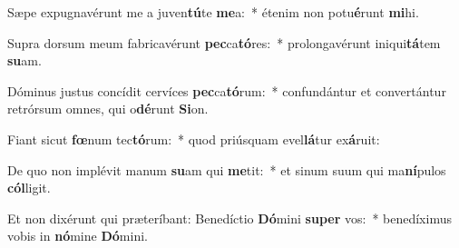 \item Sæpe expugnavérunt me a juven\textbf{tú}te \textbf{me}a:~* étenim non potu\textbf{é}runt \textbf{mi}hi.
\item Supra dorsum meum fabricavérunt \textbf{pec}ca\textbf{tó}res:~* prolongavérunt iniqui\textbf{tá}tem \textbf{su}am.
\item Dóminus justus concídit cervíces \textbf{pec}ca\textbf{tó}rum:~* confundántur et convertántur retrórsum omnes, qui o\textbf{dé}runt \textbf{Si}on.
\item Fiant sicut \textbf{fœ}num tec\textbf{tó}rum:~* quod priúsquam evel\textbf{lá}tur ex\textbf{á}ruit:
\item De quo non implévit manum \textbf{su}am qui \textbf{me}tit:~* et sinum suum qui ma\textbf{ní}pulos \textbf{cól}ligit.
\item Et non dixérunt qui præteríbant: Benedíctio \textbf{Dó}mini \textbf{su}\textbf{per} vos:~* benedíximus vobis in \textbf{nó}mine \textbf{Dó}mini.
